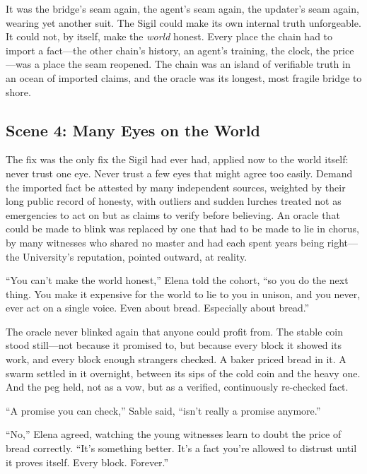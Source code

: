 \documentclass[12pt,letterpaper]{book}
\begin{document}
It was the bridge's seam again, the agent's seam again, the updater's seam again,
wearing yet another suit. The Sigil could make its own internal truth unforgeable.
It could not, by itself, make the \emph{world} honest. Every place the chain had to
import a fact---the other chain's history, an agent's training, the clock, the
price---was a place the seam reopened. The chain was an island of verifiable truth
in an ocean of imported claims, and the oracle was its longest, most fragile bridge
to shore.

\hypertarget{scene-4-many-eyes-on-the-world}{%
\subsection{Scene 4: Many Eyes on the
World}\label{scene-4-many-eyes-on-the-world}}

The fix was the only fix the Sigil had ever had, applied now to the world itself:
never trust one eye. Never trust a few eyes that might agree too easily. Demand the
imported fact be attested by many independent sources, weighted by their long
public record of honesty, with outliers and sudden lurches treated not as
emergencies to act on but as claims to verify before believing. An oracle that
could be made to blink was replaced by one that had to be made to lie in chorus, by
many witnesses who shared no master and had each spent years being right---the
University's reputation, pointed outward, at reality.

``You can't make the world honest,'' Elena told the cohort, ``so you do the next
thing. You make it expensive for the world to lie to you in unison, and you never,
ever act on a single voice. Even about bread. Especially about bread.''

The oracle never blinked again that anyone could profit from. The stable coin stood
still---not because it promised to, but because every block it showed its work, and
every block enough strangers checked. A baker priced bread in it. A swarm settled in
it overnight, between its sips of the cold coin and the heavy one. And the peg held,
not as a vow, but as a verified, continuously re-checked fact.

``A promise you can check,'' Sable said, ``isn't really a promise anymore.''

``No,'' Elena agreed, watching the young witnesses learn to doubt the price of
bread correctly. ``It's something better. It's a fact you're allowed to distrust
until it proves itself. Every block. Forever.''
\end{document}
